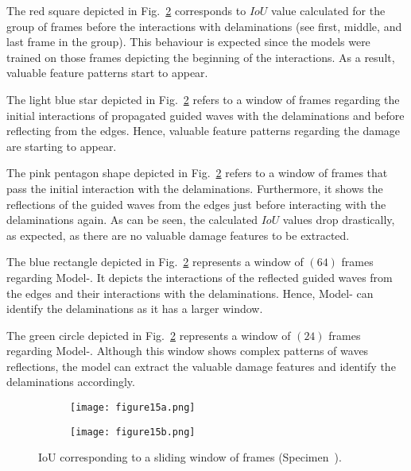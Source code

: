 The red square depicted in Fig.~\ref{fig:L3_S4_B_333x333p_50kHz_5HC_shapes_} corresponds to \(IoU\) value calculated for the group of frames before the interactions with delaminations (see first, middle, and last frame in the group).
This behaviour is expected since the models were trained on those frames depicting the beginning of the interactions. 
As a result, valuable feature patterns start to appear.

The light blue star depicted in Fig.~\ref{fig:L3_S4_B_333x333p_50kHz_5HC_shapes_} refers to a window of frames regarding the initial interactions of propagated guided waves with the delaminations and before reflecting from the edges.
Hence, valuable feature patterns regarding the damage are starting to appear.

The pink pentagon shape depicted in Fig.~\ref{fig:L3_S4_B_333x333p_50kHz_5HC_shapes_} refers to a window of frames that pass the initial interaction with the delaminations. Furthermore, it shows the reflections of the guided waves from the edges just before interacting with the delaminations again.
As can be seen, the calculated \(IoU\) values drop drastically, as expected, as there are no valuable damage features to be extracted.  

The blue rectangle depicted in Fig.~\ref{fig:L3_S4_B_333x333p_50kHz_5HC_shapes_} represents a window of \((64)\) frames regarding Model-.
It depicts the interactions of the reflected guided waves from the edges and their interactions with the delaminations. 
Hence, Model- can identify the delaminations as it has a larger window.

The green circle depicted in Fig.~\ref{fig:L3_S4_B_333x333p_50kHz_5HC_shapes_} represents a window of \((24)\) frames regarding Model-.
Although this window shows complex patterns of waves reflections, the model can extract the valuable damage features and identify the delaminations accordingly.
\begin{figure} [!h]
	\centering
	\begin{subfigure}[b]{1\textwidth}
		\centering
		\texttt{[image: figure15a.png]}
		\caption{}
		\label{fig:L3_S4_B_333x333p_50kHz_5HC_IoU}
	\end{subfigure}
	\par\medskip
	\begin{subfigure}[b]{1\textwidth}
		\centering
		\texttt{[image: figure15b.png]}
		\caption{} 
		\label{fig:L3_S4_B_333x333p_50kHz_5HC_shapes_}
	\end{subfigure}
	\caption{IoU corresponding to a sliding window of frames (Specimen~).}
	\label{fig:L3_S4_B_333x333p_50kHz_5HC_IoU_centre_window}
\end{figure} 

